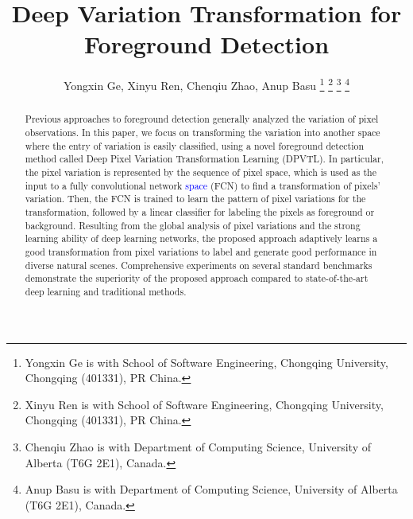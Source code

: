 \documentclass[journal]{IEEEtran}
\begin{document}
\title{Deep Variation Transformation for Foreground Detection}

\author{Yongxin Ge, 
        Xinyu Ren, 
        Chenqiu Zhao,
        Anup Basu
        \thanks{Yongxin Ge is with School of Software Engineering, Chongqing University, Chongqing (401331), PR China.}
        \thanks{Xinyu Ren is with School of Software Engineering, Chongqing University, Chongqing (401331), PR China.}
        \thanks{Chenqiu Zhao is with Department of Computing Science, University of Alberta (T6G 2E1), Canada.}
        \thanks{Anup Basu is with Department of Computing Science, University of Alberta (T6G 2E1), Canada.}
        }




\maketitle


\begin{abstract}
%
Previous approaches to foreground detection generally analyzed the variation of pixel observations.
In this paper, we focus on transforming the variation into another space where the entry of variation is easily classified, using a novel foreground detection method called Deep Pixel Variation Transformation Learning (DPVTL).
    In particular, the pixel variation is represented by the sequence of pixel space, which is used as the input to a fully convolutional network \textcolor{blue}{space} (FCN) to find a transformation of pixels' variation.
Then, the FCN is trained to learn the pattern of pixel variations for the transformation, followed by a linear classifier for labeling the pixels as foreground or background.
%    
Resulting from the global analysis of pixel variations and the strong learning ability of deep learning networks,
the proposed approach adaptively learns a good transformation from pixel variations to label and generate good performance in diverse natural scenes.
%
Comprehensive experiments on several standard benchmarks demonstrate the superiority of the proposed approach compared to state-of-the-art deep learning and traditional methods.
%
\end{abstract}
\end{document}
